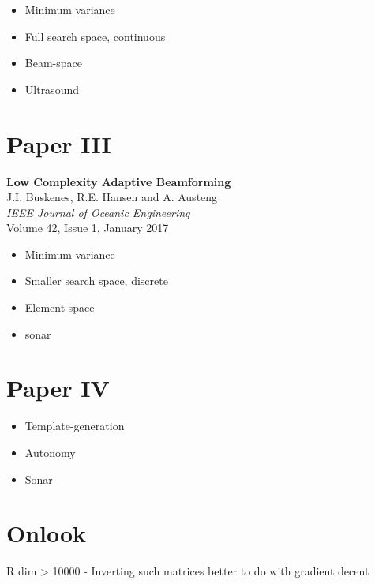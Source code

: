 \begin{itemize}
\item Minimum variance
\item Full search space, continuous
\item Beam-space
\item Ultrasound
\end{itemize}


\section{Paper III}\label{sec:paperIII} %
\textbf{Low Complexity Adaptive Beamforming}~\cite{Buskenes2015}\\
J.I. Buskenes, R.E. Hansen and A. Austeng\\
\textit{IEEE Journal of Oceanic Engineering}\\
Volume 42, Issue 1, January 2017

\begin{itemize}
\item Minimum variance
\item Smaller search space, discrete
\item Element-space
\item sonar
\end{itemize}



\section{Paper IV}\label{sec:paperIV} %

\begin{itemize}
\item Template-generation
\item Autonomy
\item Sonar
\end{itemize}



\section{Onlook}

R dim > 10000
- Inverting such matrices better to do with gradient decent

